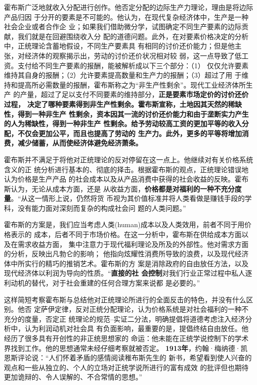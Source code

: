 霍布斯广泛地就收入分配进行创作。他否定分配的边际生产力理论，理由是将边际产品归因
于分开的要素是不可能的。他认为，在现代复杂经济体中，生产是一种社会企业或者合作企
业；如果我们借助微分学，试图确定不同生产要素的边际贡献，我们就是在回避围绕收入分
配的道德问题。此外，在对要素价格决定的分析中，正统理论含蓄地假设，不同生产要素具
有相同的讨价还价能力；但是他主张，对经济体的观察揭示出，劳动的讨价还价状况相对较
弱，这一点导致了低工资。支付给不同生产要素的报酬，能被解析成以下三个部分：（1）
仅仅允许要素维持其自身的报酬；（2）允许要素提高数量和生产力的报酬；（3）超过了用
于维持和提高所必需数量的报酬，霍布斯称之为“非生产性剩余”。现代工业经济体所生产
的产量，超过了足以支付不同要素的维持部分，\textbf{正是要素市场定价的讨价还价过程，
决定了哪种要素得到非生产性剩余。霍布斯宣称，土地因其天然的稀缺性，得到一种非生产
性剩余，资本因其一流的讨价还价能力和由于垄断实力产生的人为稀缺性，得到一种非生产
性剩余。给予劳动较高工资的更加平等的收入分配，不仅会更加公平，而且也提高了劳动的
生产力。此外，更多的平等将增加消费，减少储蓄，从而使经济体避免经济萧条。}

霍布斯并不满足于将他对正统理论的反对停留在这一点上。他继续对有关价格系统含义的正
统分析进行基本的、彻底的择击。根据霍布斯的观点，正统理论错误地认为价格是生产产品
的社会成本以及从产品消费中获得的社会收益的反映。霍布斯认为，无论从成本方面，还是
从收益方面，\textbf{价格都是对福利的一种不充分度量}。“从这一情形上说，仍然将货
币视为其价值标准并将人类看做是赚钱手段的学科，没有能力面对深刻而复杂的构成社会问
题的人类问题。”

霍布斯的方案是，我们应当考虑人类(human)成本以及人类效用，前者不同于用价格表示的
成本，后者不同于市场价格。在这一分析中，霍布斯在供给成本方面以及在需求收益方面，
集中注意力于现代福利理论及所及的外部性。他对需求方面的分析，反映出凡勃仑的影响；
他指向炫耀性消费所导致的浪费，以及现代经济体中所实行的精巧的推销艺术。霍布斯的方
案是消除政府的自由放任方法，以及现代经济体以利润为导向的性质。“\textbf{直接的社
会控制}对我们行业正常过程中私人逐利动机的替代，对于社会重建的任何合理方案来说都
是必要的。”

这样简短考察霍布斯与总结他对正统理论所进行的全面反击的特色，并没有什么区别。他否
定萨伊定律，反对正统分配理论，认为价格系统是对社会福利的一种不充分的度量，否定正
统理论的规范--实证二分法，明确提倡将道德考虑注入经济分析中，认为利润动机对社会具
有负面影响，最重要的是，提倡终结自由放任。他经历了很多具有开创性的非正统思想家的
命运：他未能在正统学说控制下的学术界找到工作。他的思想通常未经仔细考察就被否定。
\textbf{1913年}，约翰·梅纳德·凯恩斯评论说：“人们怀着矛盾的感情阅读稚布斯先生的
新书，希望看到使人兴奋的观点和一些从独立的、个人的立场对正统学说所进行的富有成效
的批评但也期待更加诡辩的、令人误解的、不合常情的思想。”

